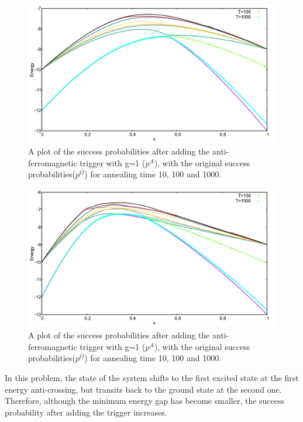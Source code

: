 \documentclass[../main.tex]{subfiles}
\begin{document}
\begin{figure}[H]
\centering 
\includegraphics[scale=0.3]{441_O_T100_1000.png}
\caption{A plot of the success probabilities after adding the anti-ferromagnetic trigger with g=1 ($p^A$), with the original success probabilities($p^O$) for annealing time 10, 100 and 1000.}
\label{fig:a28}
\end{figure}
\begin{figure}[H]
\centering 
\includegraphics[scale=0.3]{441_A_g1_T100_1000.png}
\caption{A plot of the success probabilities after adding the anti-ferromagnetic trigger with g=1 ($p^A$), with the original success probabilities($p^O$) for annealing time 10, 100 and 1000.}
\label{fig:a29}
\end{figure}

In this problem, the state of the system shifts to the first excited state at the first energy anti-crossing, but transits back to the ground state at the second one. Therefore, although the minimum energy gap has become smaller, the success probability after adding the trigger increases.\\
\end{document}
